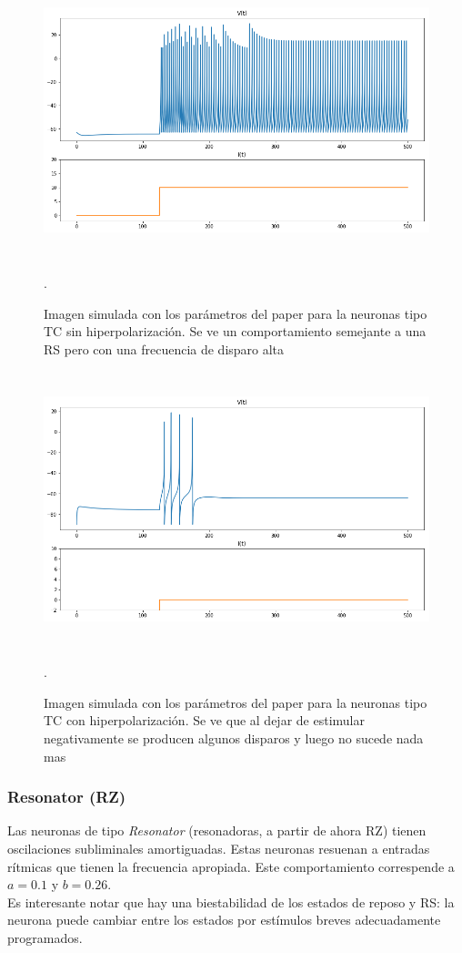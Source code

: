 \documentclass[12pt]{article}
\begin{document}
\begin{figure}[h!]
    \centering
        \includegraphics[height=8cm]{images/TC_normal.png}
    \caption[fontsize=2pt]{Imagen simulada con los parámetros del paper para la neuronas tipo TC sin hiperpolarización. Se ve un comportamiento semejante a una RS pero con una frecuencia de disparo alta}.
\end{figure}
\newpage

\begin{figure}[h!]
    \centering
        \includegraphics[height=8cm]{images/TC_hiper.png}
    \caption[fontsize=2pt]{Imagen simulada con los parámetros del paper para la neuronas tipo TC con hiperpolarización. Se ve que al dejar de estimular negativamente se producen algunos disparos y luego no sucede nada mas}.
\end{figure}
\newpage

\subsubsection{Resonator (RZ)}
Las neuronas de tipo \textit{Resonator} (resonadoras, a partir de ahora RZ) tienen oscilaciones subliminales amortiguadas. Estas neuronas resuenan a entradas rítmicas que tienen la frecuencia apropiada.
Este comportamiento correspende a $a = 0.1$ y $b = 0.26$. \\
Es interesante notar que hay una biestabilidad de los estados de reposo y RS: la neurona puede cambiar entre los estados por estímulos breves adecuadamente programados.
\end{document}
